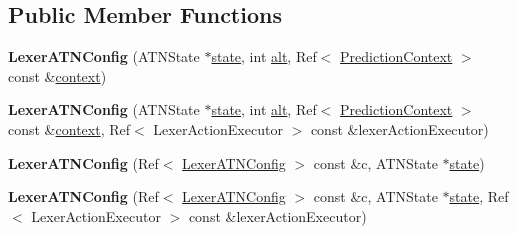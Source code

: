 \subsection*{Public Member Functions}
\begin{DoxyCompactItemize}
\item 
\mbox{\label{classantlr4_1_1atn_1_1LexerATNConfig_a347b0e0d2e256ac0195348d4a7064c2d}} 
{\bfseries Lexer\+A\+T\+N\+Config} (A\+T\+N\+State $\ast$\hyperlink{classantlr4_1_1atn_1_1ATNConfig_ae2e2757839f60f245b1a30c1f83bd52d}{state}, int \hyperlink{classantlr4_1_1atn_1_1ATNConfig_ab4b68e6c1b1c70197a21fd62009bf9b8}{alt}, Ref$<$ \hyperlink{classantlr4_1_1atn_1_1PredictionContext}{Prediction\+Context} $>$ const \&\hyperlink{classantlr4_1_1atn_1_1ATNConfig_a1f30878a632f67672f16b52eefb01f26}{context})
\item 
\mbox{\label{classantlr4_1_1atn_1_1LexerATNConfig_a118f78b55a1d55afac2ce2d2e84f8057}} 
{\bfseries Lexer\+A\+T\+N\+Config} (A\+T\+N\+State $\ast$\hyperlink{classantlr4_1_1atn_1_1ATNConfig_ae2e2757839f60f245b1a30c1f83bd52d}{state}, int \hyperlink{classantlr4_1_1atn_1_1ATNConfig_ab4b68e6c1b1c70197a21fd62009bf9b8}{alt}, Ref$<$ \hyperlink{classantlr4_1_1atn_1_1PredictionContext}{Prediction\+Context} $>$ const \&\hyperlink{classantlr4_1_1atn_1_1ATNConfig_a1f30878a632f67672f16b52eefb01f26}{context}, Ref$<$ Lexer\+Action\+Executor $>$ const \&lexer\+Action\+Executor)
\item 
\mbox{\label{classantlr4_1_1atn_1_1LexerATNConfig_af0e6621b496beb5ef8049ed376db2648}} 
{\bfseries Lexer\+A\+T\+N\+Config} (Ref$<$ \hyperlink{classantlr4_1_1atn_1_1LexerATNConfig}{Lexer\+A\+T\+N\+Config} $>$ const \&c, A\+T\+N\+State $\ast$\hyperlink{classantlr4_1_1atn_1_1ATNConfig_ae2e2757839f60f245b1a30c1f83bd52d}{state})
\item 
\mbox{\label{classantlr4_1_1atn_1_1LexerATNConfig_a25e0c9fa4cfe33118eb1de7f60601fed}} 
{\bfseries Lexer\+A\+T\+N\+Config} (Ref$<$ \hyperlink{classantlr4_1_1atn_1_1LexerATNConfig}{Lexer\+A\+T\+N\+Config} $>$ const \&c, A\+T\+N\+State $\ast$\hyperlink{classantlr4_1_1atn_1_1ATNConfig_ae2e2757839f60f245b1a30c1f83bd52d}{state}, Ref$<$ Lexer\+Action\+Executor $>$ const \&lexer\+Action\+Executor)
\item 

\end{DoxyCompactItemize}
